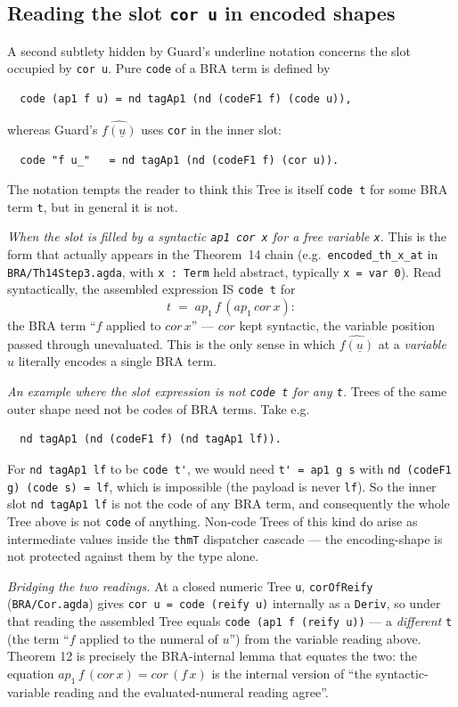 \documentclass[11pt]{article}
\begin{document}
\subsection{Reading the slot \texttt{cor u} in encoded shapes}
\label{subsec:cor-slot-reading}

A second subtlety hidden by Guard's underline notation concerns the
slot occupied by \texttt{cor u}.  Pure \verb|code| of a BRA term is
defined by
\begin{verbatim}
  code (ap1 f u) = nd tagAp1 (nd (codeF1 f) (code u)),
\end{verbatim}
whereas Guard's $\widehat{f(\underline{u})}$ uses \verb|cor| in the
inner slot:
\begin{verbatim}
  code "f u_"   = nd tagAp1 (nd (codeF1 f) (cor u)).
\end{verbatim}
The notation tempts the reader to think this Tree is itself
\verb|code t| for some BRA term \verb|t|, but in general it is not.

\emph{When the slot is filled by a syntactic \texttt{ap1 cor x} for a
free variable \texttt{x}.}  This is the form that actually appears in
the Theorem~14 chain (e.g.\ \verb|encoded_th_x_at| in
\verb|BRA/Th14Step3.agda|, with \verb|x : Term| held abstract,
typically \verb|x = var 0|).  Read syntactically, the assembled
expression IS \verb|code t| for
\[
  t \;=\; \mathit{ap}_1\,f\,(\mathit{ap}_1\,\mathit{cor}\,x):
\]
the BRA term ``$f$ applied to $\mathit{cor}\,x$'' --- $\mathit{cor}$
kept syntactic, the variable position passed through unevaluated.
This is the only sense in which $\widehat{f(\underline{u})}$ at a
\emph{variable} $u$ literally encodes a single BRA term.

\emph{An example where the slot expression is not \texttt{code t} for
any \texttt{t}.}  Trees of the same outer shape need not be codes of
BRA terms.  Take e.g.\
\begin{verbatim}
  nd tagAp1 (nd (codeF1 f) (nd tagAp1 lf)).
\end{verbatim}
For \verb|nd tagAp1 lf| to be \verb|code t'|, we would need
\verb|t' = ap1 g s| with \verb|nd (codeF1 g) (code s) = lf|, which is
impossible (the payload is never \verb|lf|).  So the inner slot
\verb|nd tagAp1 lf| is not the code of any BRA term, and consequently
the whole Tree above is not \verb|code| of anything.  Non-code Trees
of this kind do arise as intermediate values inside the \verb|thmT|
dispatcher cascade --- the encoding-shape is not protected against
them by the type alone.

\emph{Bridging the two readings.}  At a closed numeric Tree \verb|u|,
\verb|corOfReify| (\verb|BRA/Cor.agda|) gives
\verb|cor u = code (reify u)| internally as a \texttt{Deriv}, so under
that reading the assembled Tree equals \verb|code (ap1 f (reify u))|
--- a \emph{different} \verb|t| (the term ``$f$ applied to the numeral
of $u$'') from the variable reading above.  Theorem 12 is precisely
the BRA-internal lemma that equates the two: the equation
$\mathit{ap}_1\,f\,(\mathit{cor}\,x) = \mathit{cor}\,(f\,x)$ is the
internal version of ``the syntactic-variable reading and the
evaluated-numeral reading agree''.
\end{document}
